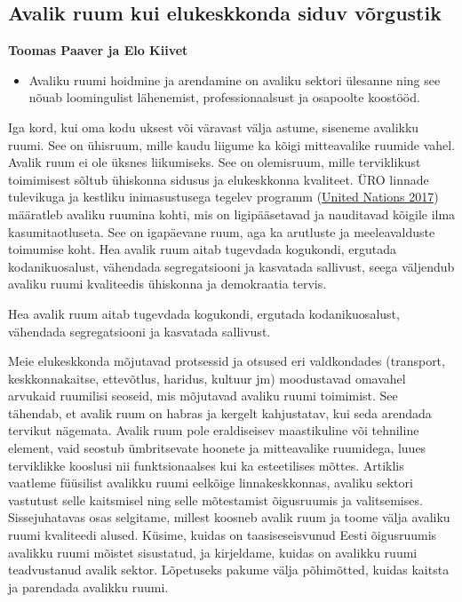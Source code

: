 \documentclass[estonian,]{article}
\providecommand{\tightlist}{%
  \setlength{\itemsep}{0pt}\setlength{\parskip}{0pt}}
\begin{document}
\hypertarget{avalik-ruum-kui-elukeskkonda-siduv-vuxf5rgustik}{%
\subsection{Avalik ruum kui elukeskkonda siduv võrgustik}\label{avalik-ruum-kui-elukeskkonda-siduv-vuxf5rgustik}}

\begin{authors}
\textbf{Toomas Paaver ja Elo Kiivet}
\end{authors}

\begin{points}
\begin{itemize}
\tightlist
\item
  Avaliku ruumi hoidmine ja arendamine on avaliku sektori ülesanne ning
  see nõuab loomingulist lähenemist, professionaalsust ja osapoolte
  koostööd.
\end{itemize}
\end{points}

Iga kord, kui oma kodu uksest või väravast välja astume, siseneme avalikku ruumi. See on ühisruum, mille kaudu liigume ka kõigi mitteavalike ruumide vahel. Avalik ruum ei ole üksnes liikumiseks. See on olemisruum, mille terviklikust toimimisest sõltub ühiskonna sidusus ja elukeskkonna kvaliteet. ÜRO linnade tulevikuga ja kestliku inimasustusega tegelev programm (\protect\hyperlink{United2017}{United Nations 2017}) määratleb avaliku ruumina kohti, mis on ligipääsetavad ja nauditavad kõigile ilma kasumitaotluseta. See on igapäevane ruum, aga ka arutluste ja meeleavalduste toimumise koht. Hea avalik ruum aitab tugevdada kogukondi, ergutada kodanikuosalust, vähendada segregatsiooni ja kasvatada sallivust, seega väljendub avaliku ruumi kvaliteedis ühiskonna ja demokraatia tervis.

\begin{blockquote-left}
Hea avalik ruum aitab tugevdada kogukondi, ergutada kodanikuosalust,
vähendada segregatsiooni ja kasvatada sallivust.
\end{blockquote-left}

Meie elukeskkonda mõjutavad protsessid ja otsused eri valdkondades (transport, keskkonnakaitse, ettevõtlus, haridus, kultuur jm) moodustavad omavahel arvukaid ruumilisi seoseid, mis mõjutavad avaliku ruumi toimimist. See tähendab, et avalik ruum on habras ja kergelt kahjustatav, kui seda arendada tervikut nägemata. Avalik ruum pole eraldiseisev maastikuline või tehniline element, vaid seostub ümbritsevate hoonete ja mitteavalike ruumidega, luues terviklikke kooslusi nii funktsionaalses kui ka esteetilises mõttes.
Artiklis vaatleme füüsilist avalikku ruumi eelkõige linnakeskkonnas, avaliku sektori vastutust selle kaitsmisel ning selle mõtestamist õigusruumis ja valitsemises. Sissejuhatavas osas selgitame, millest koosneb avalik ruum ja toome välja avaliku ruumi kvaliteedi alused. Küsime, kuidas on taasiseseisvunud Eesti õigusruumis avalikku ruumi mõistet sisustatud, ja kirjeldame, kuidas on avalikku ruumi teadvustanud avalik sektor. Lõpetuseks pakume välja põhimõtted, kuidas kaitsta ja parendada avalikku ruumi.
\end{document}
